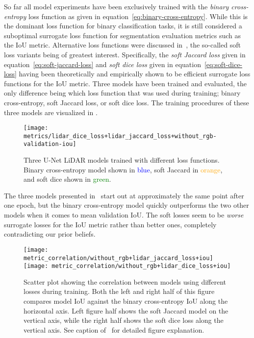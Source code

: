 So far all model experiments have been exclusively trained with the \textit{binary cross-entropy} loss function as given in equation~\eqref{eq:binary-cross-entropy}.
While this is the dominant loss function for binary classification tasks, it is still considered a suboptimal surrogate loss function for segmentation evaluation metrics such as the IoU metric.
Alternative loss functions were discussed in~, the so-called soft loss variants being of greatest interest.
Specifically, the \textit{soft Jaccard loss} given in equation~\eqref{eq:soft-jaccard-loss} and \textit{soft dice loss} given in equation~\eqref{eq:soft-dice-loss} having been theoretically and empirically shown to be efficient surrogate loss functions for the IoU metric.
Three models have been trained and evaluated, the only difference being which loss function that was used during training; binary cross-entropy, soft Jaccard loss, or soft dice loss.
The training procedures of these three models are visualized in .

\begin{figure}[H]
  \centering
  \texttt{[image: metrics/lidar\_dice\_loss+lidar\_jaccard\_loss+without\_rgb-validation-iou]}
  \caption{%
    Three U-Net LiDAR models trained with different loss functions.
    Binary cross-entropy model shown in \textcolor{blue}{blue}, soft Jaccard in \textcolor{orange}{orange}, and soft dice shown in \textcolor{green}{green}.
  }%
  \label{fig:losses-training}
\end{figure}

The three models presented in~ start out at approximately the same point after one epoch, but the binary cross-entropy model quickly outperforms the two other models when it comes to mean validation IoU.
The soft losses seem to be \emph{worse} surrogate losses for the IoU metric rather than better ones, completely contradicting our prior beliefs.

\begin{figure}[H]
  \centering
  \texttt{[image: metric\_correlation/without\_rgb+lidar\_jaccard\_loss+iou]}
  \textcolor{gray}{\vrule}
  \texttt{[image: metric\_correlation/without\_rgb+lidar\_dice\_loss+iou]}
  \caption{%
    Scatter plot showing the correlation between models using different losses during training.
    Both the left and right half of this figure compares model IoU against the binary cross-entropy IoU along the horizontal axis.
    Left figure half shows the soft Jaccard model on the vertical axis, while the right half shows the soft dice loss along the vertical axis.
    See caption of~ for detailed figure explanation.
  }
\end{figure}
